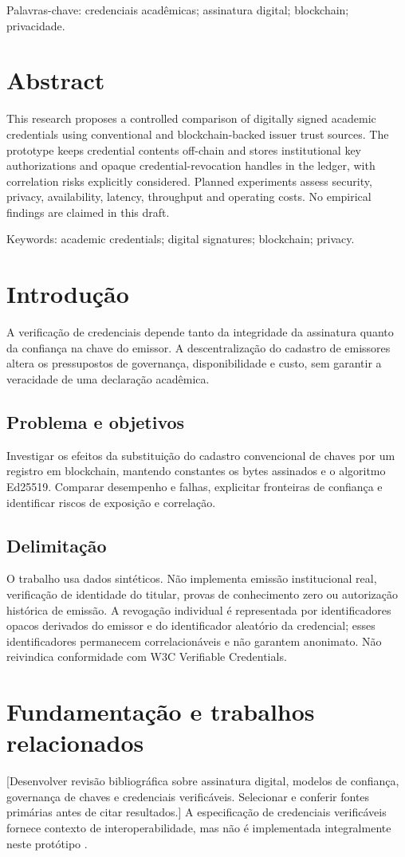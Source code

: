 \documentclass[12pt,a4paper,oneside]{report}
\begin{document}
\noindent Palavras-chave: credenciais acadêmicas; assinatura digital; blockchain; privacidade.
\chapter*{Abstract}
This research proposes a controlled comparison of digitally signed academic credentials using conventional and blockchain-backed issuer trust sources. The prototype keeps credential contents off-chain and stores institutional key authorizations and opaque credential-revocation handles in the ledger, with correlation risks explicitly considered. Planned experiments assess security, privacy, availability, latency, throughput and operating costs. No empirical findings are claimed in this draft.

\noindent Keywords: academic credentials; digital signatures; blockchain; privacy.
\tableofcontents
\chapter{Introdução}
A verificação de credenciais depende tanto da integridade da assinatura quanto da confiança na chave do emissor. A descentralização do cadastro de emissores altera os pressupostos de governança, disponibilidade e custo, sem garantir a veracidade de uma declaração acadêmica.
\section{Problema e objetivos}
Investigar os efeitos da substituição do cadastro convencional de chaves por um registro em blockchain, mantendo constantes os bytes assinados e o algoritmo Ed25519. Comparar desempenho e falhas, explicitar fronteiras de confiança e identificar riscos de exposição e correlação.
\section{Delimitação}
O trabalho usa dados sintéticos. Não implementa emissão institucional real, verificação de identidade do titular, provas de conhecimento zero ou autorização histórica de emissão. A revogação individual é representada por identificadores opacos derivados do emissor e do identificador aleatório da credencial; esses identificadores permanecem correlacionáveis e não garantem anonimato. Não reivindica conformidade com W3C Verifiable Credentials.
\chapter{Fundamentação e trabalhos relacionados}
[Desenvolver revisão bibliográfica sobre assinatura digital, modelos de confiança, governança de chaves e credenciais verificáveis. Selecionar e conferir fontes primárias antes de citar resultados.] A especificação de credenciais verificáveis fornece contexto de interoperabilidade, mas não é implementada integralmente neste protótipo \cite{w3cvc}.
\end{document}

